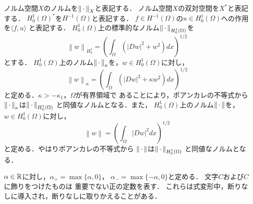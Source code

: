ノルム空間$X$のノルムを$\left\|\, \cdot \, \right\|_X$と表記する．
ノルム空間$X$の双対空間を$X^*$と表記する．
$H_0^1(\Omega)^*$を$H^{-1}(\Omega)$と表記する．
$f \in H^{-1}(\Omega)$の$u \in H_0^1(\Omega)$への作用を$\langle f, u \rangle$
と表記する．
$H_0^1(\Omega)$上の標準的なノルム$\left\|\, \cdot \, \right\|_{H_0^1(\Omega)}$を
\[
 \left\| w \right\|_{H_0^1} = \left(\int_\Omega \left( \lvert Dw \rvert^2 +
  w ^2 \right) dx\right)^{1/2}
\]
とする．
$H_0^1(\Omega)$上のノルム$\left\|\, \cdot \, \right\|_{\kappa}$を，$w \in H_0^1(\Omega)$に対し，
\[
 \left\| w \right\|_\kappa = \left(\int_\Omega \left( \lvert Dw \rvert^2 +
 \kappa w ^2 \right) dx\right)^{1/2}
\]
と定める．$\kappa > -\kappa_1$，$\Omega$が有界領域で
あることにより，ポアンカレの不等式から
$\left\|\, \cdot \, \right\|_\kappa$は$\left\|\, \cdot \, \right\|_{H_0^1(\Omega)}$
と同値なノルムとなる．また，
$H_0^1(\Omega)$上のノルム$\left\|\, \cdot \, \right\|$を，$w \in H_0^1(\Omega)$に対し，
\[
 \left\| w \right\| = \left(\int_\Omega \lvert Dw \rvert^2 dx\right)^{1/2}
\]
と定める．やはりポアンカレの不等式から
$\left\|\, \cdot \, \right\|$は$\left\|\, \cdot \, \right\|_{H_0^1(\Omega)}$
と同値なノルムとなる．

$\alpha \in \mathbb{R}$に対し，$\alpha_+ = \max \{ \alpha, 0 \}$，
$\alpha_- = \max \{ -\alpha, 0 \}$と定める．
文字$C$および$C$に飾りをつけたものは
重要でない正の定数を表す．
これらは式変形中，断りなしに導入され，断りなしに取りかえることがある．


